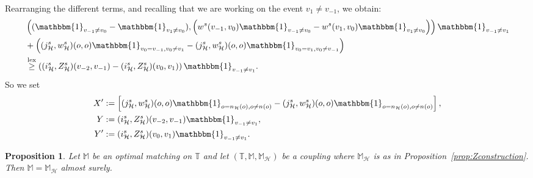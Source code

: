\documentclass[10pt,a4paper]{amsart}
\newtheorem{prop}{Proposition}
\DeclareMathOperator{\lex}{lex}
\begin{document}
Rearranging the different terms, and recalling that we are working on the event $v_1 \neq v_{-1}$, we obtain:
\begin{align*}
    &\left((\mathbbm{1}_{v_{-1}\neq v_0}-\mathbbm{1}_{v_1\neq v_0}),\left(w^s(v_{-1},v_0)\mathbbm{1}_{v_{-1}\neq v_0}-w^s(v_{1},v_0)\mathbbm{1}_{v_1 \neq v_0}\right) \right)\mathbbm{1}_{v_{-1}\neq v_1} \\
    &+ \left((j_{\mathcal{H}}^s, w_{\mathcal{H}}^s)(o,o)  \mathbbm{1}_{v_0=v_{-1}, v_0 \neq v_1}-( j_{\mathcal{H}}^s, w_{\mathcal{H}}^s)(o,o)  \mathbbm{1}_{v_0=v_{1}, v_0 \neq v_{-1}} \right) \\
    &\overset{\lex}{\geq} \left( (i^s_{\mathcal{H}},Z^s_{\mathcal{H}})(v_{-2},v_{-1}) -(i^s_{\mathcal{H}},Z^s_{\mathcal{H}})(v_{0},v_{1})\right)\mathbbm{1}_{v_{-1} \neq v_1}.
\end{align*}
So we set
\begin{align*}
    X'&:=\left[ (j_{\mathcal{H}}^s, w_{\mathcal{H}}^s)(o,o)  \mathbbm{1}_{o=n_{\mathcal{H}}(o),o\neq n(o)}- (j_{\mathcal{H}}^s, w_{\mathcal{H}}^s)(o,o)  \mathbbm{1}_{o=n_{\mathcal{H}}(o),o\neq n(o)}\right], \\
    Y&:=(i^s_{\mathcal{H}},Z^s_{\mathcal{H}})(v_{-2},v_{-1})\mathbbm{1}_{v_{-1} \neq v_1} , \\
    Y'&:=(i^s_{\mathcal{H}},Z^s_{\mathcal{H}})(v_{0},v_{1})\mathbbm{1}_{v_{-1} \neq v_1} .
\end{align*}

\begin{prop}\label{prop:uniqueness}
    Let $\mathbb{M}$ be an optimal matching on $\mathbb{T}$ and let $(\mathbb{T},\mathbb{M},\mathbb{M}_{\mathcal{H}})$ be a coupling where $\mathbb{M}_{\mathcal{H}}$ is as in Proposition~\ref{prop:Zconstruction}.
    Then $\mathbb{M}=\mathbb{M}_{\mathcal{H}}$ almost surely.
\end{prop}
\end{document}

